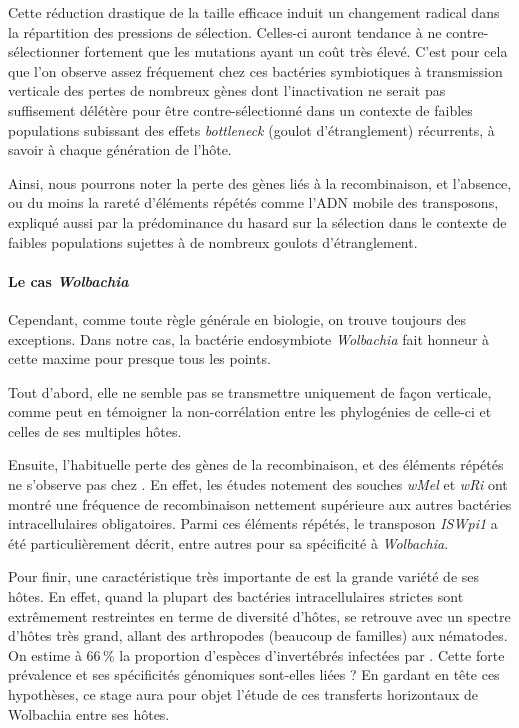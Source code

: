 Cette réduction drastique de la taille efficace induit un changement radical dans la répartition des pressions de sélection. Celles-ci auront tendance à ne contre-sélectionner fortement que les mutations ayant un coût très élevé.
C'est pour cela que l'on observe assez fréquement chez ces bactéries symbiotiques à transmission verticale des pertes de nombreux gènes\cite{wernegreen2002} dont  l'inactivation ne serait pas suffisement délétère pour être contre-sélectionné dans un contexte de faibles populations subissant des effets \textit{bottleneck} (goulot d’étranglement) récurrents, à savoir à chaque génération de l'hôte.


Ainsi, nous pourrons noter la perte des gènes liés à la recombinaison, et l'absence, ou du moins la rareté d'éléments répétés comme l'ADN mobile des transposons, expliqué aussi par la prédominance du hasard sur la sélection dans le contexte de faibles populations sujettes à de nombreux goulots d’étranglement.

\paragraph{Le cas \textit{Wolbachia}\\}
Cependant, comme toute règle générale en biologie, on trouve toujours des exceptions. Dans notre cas, la bactérie endosymbiote \textit{Wolbachia} fait honneur à cette maxime pour presque tous les points. 

Tout d'abord, elle ne semble pas se transmettre uniquement de façon verticale, comme peut en témoigner la non-corrélation entre les phylogénies de celle-ci et celles de ses multiples hôtes\cite{vavre1999}.

Ensuite, l’habituelle perte des gènes de la recombinaison, et des éléments répétés ne s’observe pas chez . En effet, les études notement des souches \textit{wMel} et \textit{wRi} ont montré une fréquence de recombinaison nettement supérieure aux autres bactéries intracellulaires obligatoires.
Parmi ces éléments répétés, le transposon \textit{ISWpi1} a été particulièrement décrit\cite{Cordaux2008}, entre autres pour sa spécificité à \textit{Wolbachia}.%

Pour finir, une caractéristique très importante de  est la grande variété de ses hôtes. En effet, quand la plupart des bactéries intracellulaires strictes sont extrêmement restreintes en terme de diversité d'hôtes,  se retrouve avec un spectre d'hôtes très grand, allant des arthropodes (beaucoup de familles) aux nématodes. On estime à 66\,\% la proportion d'espèces d'invertébrés infectées par \cite{hilgenboecker2008}.
Cette forte prévalence et ses spécificités génomiques sont-elles liées ?
En gardant en tête ces hypothèses, ce stage aura pour objet l’étude de ces transferts horizontaux de Wolbachia entre ses hôtes.

